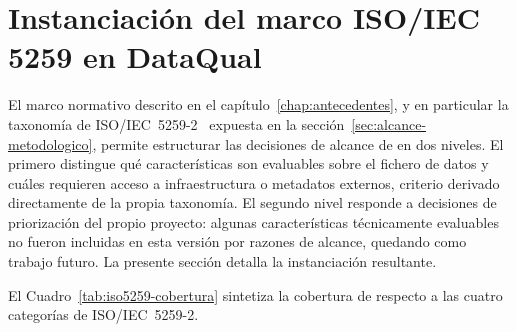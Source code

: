 \section{Instanciación del marco \ac{ISO}/\ac{IEC} 5259 en DataQual}
\label{sec:instanciacion-iso5259}

El marco normativo descrito en el capítulo~\ref{chap:antecedentes},
y en particular la taxonomía de
\ac{ISO}/\ac{IEC}~5259-2~\citep{iso5259} expuesta en la
sección~\ref{sec:alcance-metodologico}, permite estructurar las decisiones
de alcance de \dataqual en dos niveles.  El primero distingue qué
características son evaluables sobre el fichero de datos y cuáles requieren
acceso a infraestructura o metadatos externos, criterio derivado
directamente de la propia taxonomía.  El segundo nivel responde a
decisiones de priorización del propio proyecto: algunas características
técnicamente evaluables no fueron incluidas en esta versión por razones de
alcance, quedando como trabajo futuro.  La presente sección
detalla la instanciación resultante.

El Cuadro~\ref{tab:iso5259-cobertura} sintetiza la cobertura de \dataqual
respecto a las cuatro categorías de \ac{ISO}/\ac{IEC}~5259-2.

